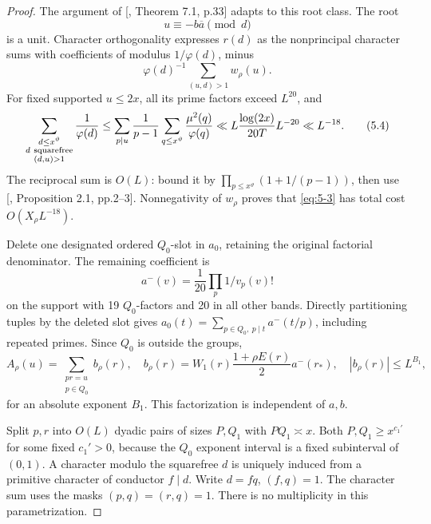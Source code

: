 \documentclass[11pt]{article}
\theoremstyle{definition}
\theoremstyle{definition}
\begin{document}
\begin{proof}
The argument of [, Theorem 7.1, p.33] adapts to this root class. The root
\begin{equation*}
u\equiv-b\overline a\pmod d
\end{equation*}
is a unit. Character orthogonality expresses \(r(d)\) as the nonprincipal character sums with coefficients of modulus \(1/\varphi(d)\), minus
\begin{equation}
\varphi(d)^{-1}\sum_{(u,d)>1}w_\rho(u).                 \tag{5.3}\label{eq:5-3}
\end{equation}
For fixed supported \(u\le2x\), all its prime factors exceed \(L^{20}\), and
\begin{equation}
\sum_{\substack{d\le x^\vartheta\\d\ {\rm squarefree}\\(d,u)>1}}
 \frac1{\varphi(d)}
 \le \sum_{p\mid u}\frac1{p-1}
       \sum_{q\le x^\vartheta}\frac{\mu^2(q)}{\varphi(q)}
 \ll L\frac{\log(2x)}{20T}L^{-20}\ll L^{-18}.            \tag{5.4}\label{eq:5-4}
\end{equation}
The reciprocal sum is \(O(L)\): bound it by
\(\prod_{p\le x^\vartheta}(1+1/(p-1))\), then use [, Proposition 2.1, pp.2--3]. Nonnegativity of \(w_\rho\) proves that \eqref{eq:5-3} has total cost \(O(X_\rho L^{-18})\).

Delete one designated ordered \(Q_0\)-slot in \(a_0\), retaining the original factorial denominator. The remaining coefficient is
\begin{equation*}
a^-(v)=\frac1{20}\prod_p1/v_p(v)!
\end{equation*}
on the support with 19 \(Q_0\)-factors and 20 in all other bands. Directly partitioning tuples by the deleted slot gives
\(a_0(t)=\sum_{p\in Q_0,\ p\mid t}a^-(t/p)\), including repeated primes. Since \(Q_0\) is outside the groups,
\begin{equation}
A_\rho(u)=\sum_{\substack{pr=u\\p\in Q_0}}b_\rho(r),\quad
 b_\rho(r)=W_1(r)\frac{1+\rho E(r)}2a^-(r_*),\quad
 |b_\rho(r)|\le L^{B_1},                               \tag{5.5}\label{eq:5-5}
\end{equation}
for an absolute exponent \(B_1\). This factorization is independent of \(a,b\).

Split \(p,r\) into \(O(L)\) dyadic pairs of sizes \(P,Q_1\) with \(PQ_1\asymp x\). Both \(P,Q_1\ge x^{c_1'}\) for some fixed \(c_1'>0\), because the \(Q_0\) exponent interval is a fixed subinterval of \((0,1)\). A character modulo the squarefree \(d\) is uniquely induced from a primitive character of conductor \(f\mid d\). Write \(d=fq\), \((f,q)=1\). The character sum uses the masks \((p,q)=(r,q)=1\). There is no multiplicity in this parametrization.


\end{proof}
\end{document}

